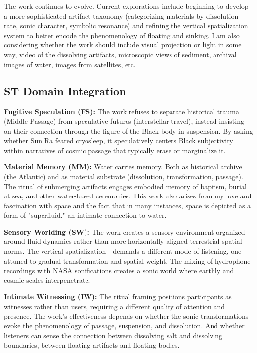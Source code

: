 The work continues to evolve. Current explorations include beginning to develop a more sophisticated artifact taxonomy (categorizing materials by dissolution rate, sonic character, symbolic resonance) and refining the vertical spatialization system to better encode the phenomenology of floating and sinking. I am also considering whether the work should include visual projection or light in some way, video of the dissolving artifacts, microscopic views of sediment, archival images of water, images from satellites, etc.

\subsection{ST Domain Integration}

\textbf{Fugitive Speculation (FS):} The work refuses to separate historical trauma (Middle Passage) from speculative futures (interstellar travel), instead insisting on their connection through the figure of the Black body in suspension. By asking whether Sun Ra feared cryosleep, it speculatively centers Black subjectivity within narratives of cosmic passage that typically erase or marginalize it.

\textbf{Material Memory (MM):} Water carries memory. Both as historical archive (the Atlantic) and as material substrate (dissolution, transformation, passage). The ritual of submerging artifacts engages embodied memory of baptism, burial at sea, and other water-based ceremonies. This work also arises from my love and fascination with space and the fact that in many instances, space is depicted as a form of "superfluid." an intimate connection to water.

\textbf{Sensory Worlding (SW):} The work creates a sensory environment organized around fluid dynamics rather than more horizontally aligned terrestrial spatial norms. The vertical spatialization—demands a different mode of listening, one attuned to gradual transformation and spatial weight. The mixing of hydrophone recordings with NASA sonifications creates a sonic world where earthly and cosmic scales interpenetrate.

\textbf{Intimate Witnessing (IW):} The ritual framing positions participants as witnesses rather than users, requiring a different quality of attention and presence. The work's effectiveness depends on whether the sonic transformations evoke the phenomenology of passage, suspension, and dissolution. And whether listeners can sense the connection between dissolving salt and dissolving boundaries, between floating artifacts and floating bodies.